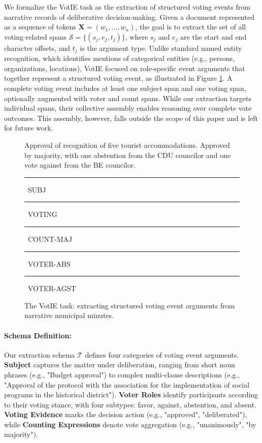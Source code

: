 \documentclass[11pt]{article}
\begin{document}
We formalize the VotIE task as the extraction of structured voting events from narrative records of deliberative decision-making. Given a document represented as a sequence of tokens $\mathbf{X} = (w_1, \dots, w_n)$, the goal is to extract the set of all voting-related spans $\mathcal{S} = \{(s_j, e_j, t_j)\}$, where $s_j$ and $e_j$ are the start and end character offsets, and $t_j$ is the argument type. Unlike standard named entity recognition, which identifies mentions of categorical entities (e.g., persons, organizations, locations), VotIE focused on role-specific event arguments that together represent a structured voting event, as illustrated in Figure \ref{fig:votie_task}. A complete voting event includes at least one subject span and one voting span, optionally augmented with voter and count spans. While our extraction targets individual spans, their collective assembly enables reasoning over complete vote outcomes. This assembly, however, falls outside the scope of this paper and is left for future work.

\begin{figure}[ht!] 
\small
\fboxsep=2pt

\noindent
\colorbox{blue!15}{Approval of recognition of five tourist accommodations}.
\colorbox{green!15}{Approved} \colorbox{cyan!15}{by majority}, with one 
abstention from the \colorbox{orange!15}{CDU councilor} and one vote against 
from the \colorbox{purple!15}{BE councilor}.

\medskip

{\scriptsize\centering\noindent
\colorbox{blue!15}{\rule{0pt}{1ex}\rule{1ex}{0pt}}~SUBJ\hspace{2pt}
\colorbox{green!15}{\rule{0pt}{1ex}\rule{1ex}{0pt}}~VOTING\hspace{2pt}
\colorbox{cyan!15}{\rule{0pt}{1ex}\rule{1ex}{0pt}}~COUNT-MAJ\hspace{2pt}
\colorbox{orange!15}{\rule{0pt}{1ex}\rule{1ex}{0pt}}~VOTER-ABS\hspace{2pt}
\colorbox{purple!15}{\rule{0pt}{1ex}\rule{1ex}{0pt}}~VOTER-AGST
}
\caption{The VotIE task: extracting structured voting event arguments from narrative municipal minutes.}
\label{fig:votie_task}
\end{figure}


\paragraph{Schema Definition:} Our extraction schema $\mathcal{T}$ defines four categories of voting event arguments. \textbf{Subject} captures the matter under deliberation, ranging from short noun phrases (e.g., "Budget approval") to complex multi-clause descriptions (e.g., "Approval of the protocol with the association for the implementation of social programs in the historical district"). \textbf{Voter Roles} identify participants according to their voting stance, with four subtypes: favor, against, abstention, and absent. \textbf{Voting Evidence} marks the decision action (e.g., "approved", "deliberated"), while \textbf{Counting Expressions} denote vote aggregation (e.g., "unanimously", "by majority").
\end{document}
